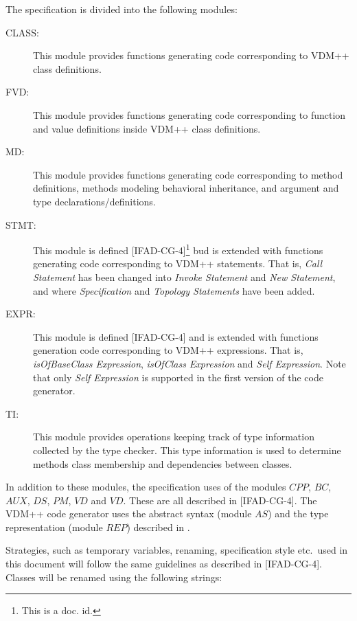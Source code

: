 \documentclass[a4paper,dvips]{article}
\begin{document}
The specification is divided into the following modules:

\begin{description}
\item[CLASS:] This module provides functions generating code
  corresponding to VDM++ class definitions.

\item[FVD:] This module provides functions generating code
  corresponding to function and value definitions inside VDM++ class
  definitions.

\item[MD:] This module provides functions generating code
  corresponding to method definitions, methods modeling behavioral
  inheritance, and argument and type declarations/definitions.

\item[STMT:] This module is defined [IFAD-CG-4]\footnote{This is a
    doc. id.} bud is extended with functions generating code
  corresponding to VDM++ statements. That is, {\em Call Statement\/}
  has been changed into {\em Invoke Statement\/} and {\em New
    Statement\/}, and where {\em Specification} and {\em Topology
    Statements} have been added.

\item[EXPR:] This module is defined [IFAD-CG-4] and is extended with
  functions generation code corresponding to VDM++ expressions. That
  is, {\em isOfBaseClass Expression},
  {\em isOfClass Expression} and {\em Self Expression\/}. Note that
  only {\em Self Expression\/} is supported in the first version of
  the code generator.

\item[TI:] This module provides operations keeping track of type
  information collected by the type checker. This type information is
  used to determine methods class membership and dependencies between
  classes.

\end{description}

In addition to these modules, the specification uses of the modules
$CPP$, $BC$, $AUX$, $DS$, $PM$, $VD$ and $VD$. These are all described
in [IFAD-CG-4]. The VDM++ code generator uses the abstract syntax
(module $AS$) and the type representation (module $REP$) described in
\cite{Lassen&93a}.


Strategies, such as temporary variables, renaming, specification
style etc.\ used in this document will follow the same guidelines as
described in [IFAD-CG-4]. Classes will be renamed using
the following strings:
\end{document}
